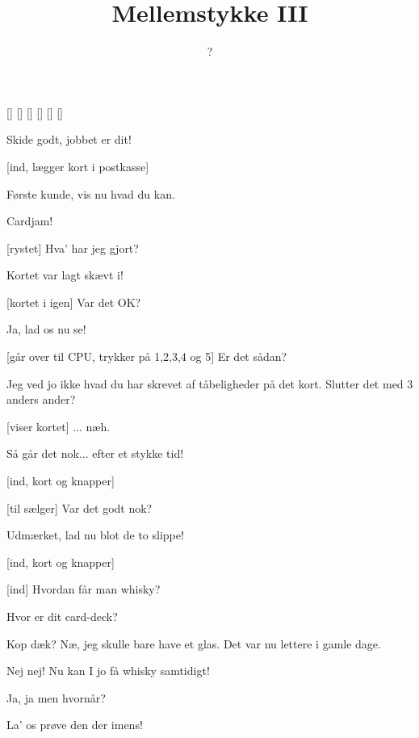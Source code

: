 \documentclass[a4paper,11pt]{article}
\title{Mellemstykke III}
\author{?}
\begin{document}
\maketitle

\begin{roles}
[]
[]
[]
[]
[]
[]
\end{roles}


\begin{sketch}

 Skide godt, jobbet er dit!

[ind, lægger kort i postkasse]

 Første kunde, vis nu hvad du kan.

 Cardjam!

[rystet] Hva' har jeg gjort?

 Kortet var lagt skævt i!

[kortet i igen] Var det OK?

 Ja, lad os nu se!

[går over til CPU, trykker på 1,2,3,4 og 5] Er det sådan?

 Jeg ved jo ikke hvad du har skrevet af tåbeligheder på det
kort.  Slutter det med 3 anders ander?

[viser kortet] ... næh.

 Så går det nok... efter et stykke tid!

[ind, kort og knapper]

[til sælger] Var det godt nok?

 Udmærket, lad nu blot de to slippe!

[ind, kort og knapper]

[ind] Hvordan får man whisky?

 Hvor er dit card-deck?

 Kop dæk?  Næ, jeg skulle bare have et glas.  Det var nu
lettere i gamle dage.

 Nej nej!  Nu kan I jo få whisky samtidigt!

 Ja, ja men hvornår?

 La' os prøve den der imens!  

\end{sketch}
\end{document}

